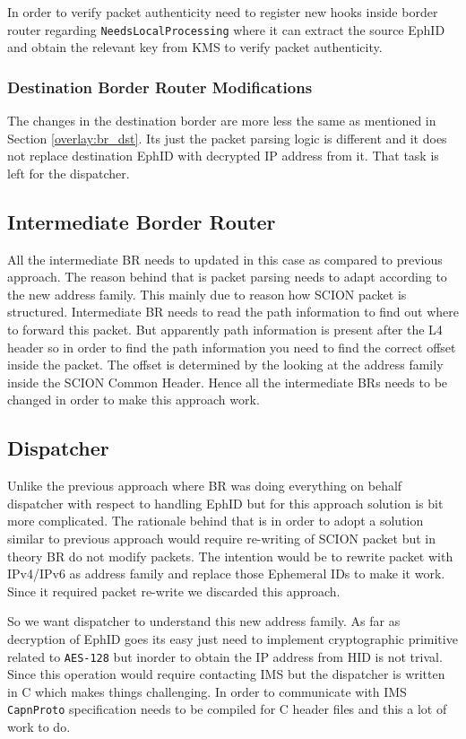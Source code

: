 In order to verify packet authenticity need to register new hooks inside border router regarding \texttt{NeedsLocalProcessing} where it can extract the source EphID and obtain the relevant key from KMS to verify packet authenticity.

\subsubsection{Destination Border Router Modifications}
The changes in the destination border are more less the same as mentioned in Section \ref{overlay:br_dst}. Its just the packet parsing logic is different and it does not replace destination EphID with decrypted IP address from it. That task is left for the dispatcher.  

\subsection{Intermediate Border Router}
All the intermediate BR needs to updated in this case as compared to previous approach. The reason behind that is packet parsing needs to adapt according to the new address family. This mainly due to reason how SCION packet is structured. Intermediate BR needs to read the path information to find out where to forward this packet. But apparently path information is present after the L4 header so in order to find the path information you need to find the correct offset inside the packet. The offset is determined by the looking at the address family inside the SCION Common Header. Hence all the intermediate BRs needs to be changed in order to make this approach work.

\subsection{Dispatcher}
Unlike the previous approach where BR was doing everything on behalf dispatcher with respect to handling EphID but for this approach solution is bit more complicated. The rationale behind that is in order to adopt a solution similar to previous approach would require re-writing of SCION packet but in theory BR do not modify packets. The intention would be to rewrite packet with IPv4/IPv6 as address family and replace those Ephemeral IDs to make it work. Since it required packet re-write we discarded this approach.

So we want dispatcher to understand this new address family. As far as decryption of EphID goes its easy just need to implement cryptographic primitive related to \texttt{AES-128} but inorder to obtain the IP address from HID is not trival. Since this operation would require contacting IMS but the dispatcher is written in C which makes things challenging. In order to communicate with IMS \texttt{CapnProto} specification needs to be compiled for C header files and this a lot of work to do.

